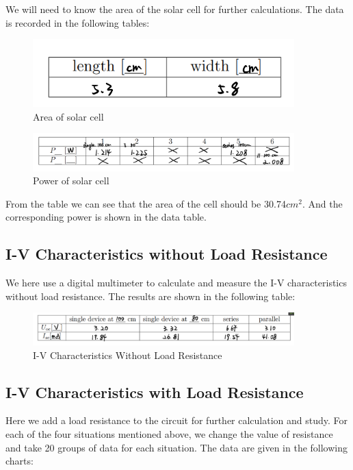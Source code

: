 \documentclass[12pt, a4paper, oneside]{article}
\begin{document}
We will need to know the area of the solar cell for further calculations. The data is recorded in the following
tables:

\begin{figure}[htbp]
	\centering
	\includegraphics[width=0.9\textwidth]{D1.png}
	\caption{Area of solar cell}
	\label{fig2}
\end{figure}

\begin{figure}[htbp]
	\centering
	\includegraphics[width=0.9\textwidth]{D2.png}
	\caption{Power of solar cell}
	\label{fig2}
\end{figure}

From the table we can see that the area of the cell should be 30.74$cm^2$. And the corresponding power is 
shown in the data table.

\subsection{I-V Characteristics without Load Resistance}
\indent

We here use a digital multimeter to calculate and measure the I-V characteristics without load resistance. The results
are shown in the following table:
\begin{figure}[htbp]
	\centering
	\includegraphics[width=0.9\textwidth]{D3.png}
	\caption{I-V Characteristics Without Load Resistance}
	\label{fig2}
\end{figure}

\subsection{I-V Characteristics with Load Resistance}
\indent

Here we add a load resistance to the circuit for further calculation and study. For each of the four situations
mentioned above, we change the value of resistance and take 20 groups of data for each situation. The data are given 
in the following charts:
\end{document}
